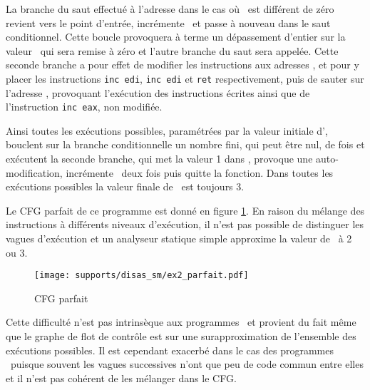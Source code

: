 La branche du saut effectué à l'adresse  dans le cas où \eax\ est différent de zéro revient vers le point d'entrée, incrémente \eax\ et passe à nouveau dans le saut conditionnel. Cette boucle provoquera à terme un dépassement d'entier sur la valeur \eax\ qui sera remise à zéro et l'autre branche du saut sera appelée.
Cette seconde branche a pour effet de modifier les instructions aux adresses ,  et  pour y placer les instructions \texttt{inc edi}, \texttt{inc edi} et \texttt{ret} respectivement, puis de sauter sur l'adresse , provoquant l'exécution des instructions écrites ainsi que de l'instruction \texttt{inc eax}, non modifiée.

Ainsi toutes les exécutions possibles, paramétrées par la valeur initiale d'\eax, bouclent sur la branche conditionnelle un nombre fini, qui peut être nul, de fois et exécutent la seconde branche, qui met la valeur 1 dans \edi, provoque une auto-modification, incrémente \edi\ deux fois puis quitte la fonction. Dans toutes les exécutions possibles la valeur finale de \edi\ est toujours 3.

Le CFG parfait de ce programme est donné en figure \ref{fig:sm_cfg_parfait}. En raison du mélange des instructions à différents niveaux d'exécution, il n'est pas possible de distinguer les vagues d'exécution et un analyseur statique simple approxime la valeur de \edi\ à 2 ou 3.

\begin{figure}[h]
\begin{center}
  \texttt{[image: supports/disas\_sm/ex2\_parfait.pdf]}
\end{center}
\caption{CFG parfait}
\label{fig:sm_cfg_parfait}
\end{figure}


Cette difficulté n'est pas intrinsèque aux programmes \sm\ et provient du fait même que le graphe de flot de contrôle est sur une surapproximation  de l'ensemble des exécutions possibles. Il est cependant exacerbé dans le cas des programmes \sm\ puisque souvent les vagues successives n'ont que peu de code commun entre elles et il n'est pas cohérent de les mélanger dans le CFG.


